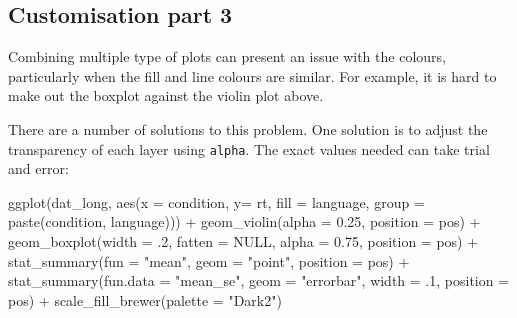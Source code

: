 \documentclass[
  english,
  doc,floatsintext]{apa6}
\newenvironment{Shaded}{\begin{snugshade}}{\end{snugshade}}
\newcommand{\AttributeTok}[1]{\textcolor[rgb]{0.77,0.63,0.00}{#1}}
\newcommand{\ConstantTok}[1]{\textcolor[rgb]{0.00,0.00,0.00}{#1}}
\newcommand{\DecValTok}[1]{\textcolor[rgb]{0.00,0.00,0.81}{#1}}
\newcommand{\FloatTok}[1]{\textcolor[rgb]{0.00,0.00,0.81}{#1}}
\newcommand{\FunctionTok}[1]{\textcolor[rgb]{0.00,0.00,0.00}{#1}}
\newcommand{\NormalTok}[1]{#1}
\newcommand{\SpecialCharTok}[1]{\textcolor[rgb]{0.00,0.00,0.00}{#1}}
\newcommand{\StringTok}[1]{\textcolor[rgb]{0.31,0.60,0.02}{#1}}
\begin{document}
\hypertarget{customisation-part-3}{%
\subsection{Customisation part 3}\label{customisation-part-3}}

Combining multiple type of plots can present an issue with the colours, particularly when the fill and line colours are similar. For example, it is hard to make out the boxplot against the violin plot above.

There are a number of solutions to this problem. One solution is to adjust the transparency of each layer using \texttt{alpha}. The exact values needed can take trial and error:

\begin{Shaded}
\begin{Highlighting}[]
\FunctionTok{ggplot}\NormalTok{(dat\_long, }\FunctionTok{aes}\NormalTok{(}\AttributeTok{x =}\NormalTok{ condition, }\AttributeTok{y=}\NormalTok{ rt, }\AttributeTok{fill =}\NormalTok{ language, }
                     \AttributeTok{group =} \FunctionTok{paste}\NormalTok{(condition, language))) }\SpecialCharTok{+}
  \FunctionTok{geom\_violin}\NormalTok{(}\AttributeTok{alpha =} \FloatTok{0.25}\NormalTok{, }\AttributeTok{position =}\NormalTok{ pos) }\SpecialCharTok{+}
  \FunctionTok{geom\_boxplot}\NormalTok{(}\AttributeTok{width =}\NormalTok{ .}\DecValTok{2}\NormalTok{, }
               \AttributeTok{fatten =} \ConstantTok{NULL}\NormalTok{, }
               \AttributeTok{alpha =} \FloatTok{0.75}\NormalTok{,}
               \AttributeTok{position =}\NormalTok{ pos) }\SpecialCharTok{+}
  \FunctionTok{stat\_summary}\NormalTok{(}\AttributeTok{fun =} \StringTok{"mean"}\NormalTok{, }
               \AttributeTok{geom =} \StringTok{"point"}\NormalTok{, }
               \AttributeTok{position =}\NormalTok{ pos) }\SpecialCharTok{+}
  \FunctionTok{stat\_summary}\NormalTok{(}\AttributeTok{fun.data =} \StringTok{"mean\_se"}\NormalTok{, }
               \AttributeTok{geom =} \StringTok{"errorbar"}\NormalTok{, }
               \AttributeTok{width =}\NormalTok{ .}\DecValTok{1}\NormalTok{,}
               \AttributeTok{position =}\NormalTok{ pos) }\SpecialCharTok{+}
  \FunctionTok{scale\_fill\_brewer}\NormalTok{(}\AttributeTok{palette =} \StringTok{"Dark2"}\NormalTok{)}
\end{Highlighting}
\end{Shaded}
\end{document}
